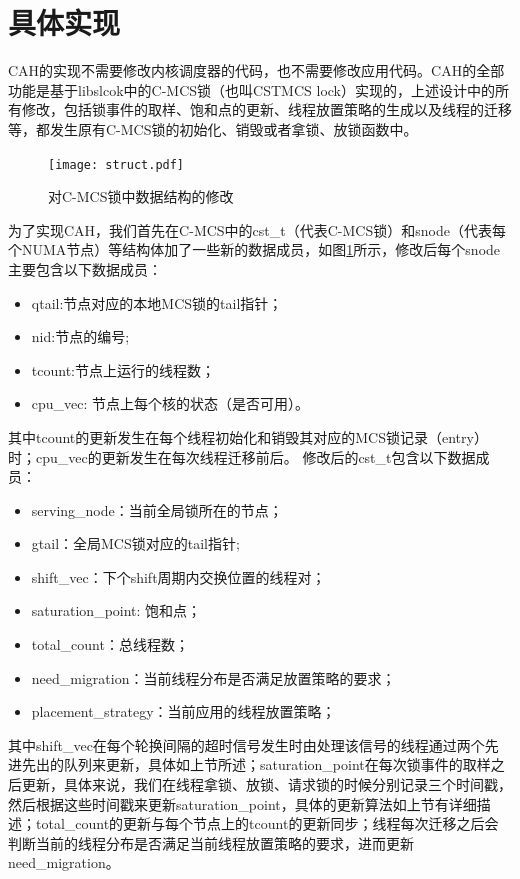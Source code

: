 \section{具体实现}
CAH的实现不需要修改内核调度器的代码，也不需要修改应用代码。CAH的全部功能是基于libslcok\cite{kashyap2017scalable}中的C-MCS锁（也叫CSTMCS lock）实现的，上述设计中的所有修改，包括锁事件的取样、饱和点的更新、线程放置策略的生成以及线程的迁移等，都发生原有C-MCS锁的初始化、销毁或者拿锁、放锁函数中。

\begin{figure}[t]
	\centering
	\texttt{[image: struct.pdf]}
	\caption{对C-MCS锁中数据结构的修改}
	\label{Fig:struct}
\end{figure}

为了实现CAH，我们首先在C-MCS中的cst\_t（代表C-MCS锁）和snode（代表每个NUMA节点）等结构体加了一些新的数据成员，如图\ref{Fig:struct}所示，修改后每个snode主要包含以下数据成员：
\begin{itemize}
\item qtail:节点对应的本地MCS锁的tail指针；
\item nid:节点的编号;
\item tcount:节点上运行的线程数；
\item cpu\_vec: 节点上每个核的状态（是否可用）。
\end{itemize}
其中tcount的更新发生在每个线程初始化和销毁其对应的MCS锁记录（entry）时；cpu\_vec的更新发生在每次线程迁移前后。
修改后的cst\_t包含以下数据成员：
\begin{itemize}
\item serving\_node：当前全局锁所在的节点；
\item gtail：全局MCS锁对应的tail指针;
\item shift\_vec：下个shift周期内交换位置的线程对；
\item saturation\_point: 饱和点；
\item total\_count：总线程数；
\item need\_migration：当前线程分布是否满足放置策略的要求；
\item placement\_strategy：当前应用的线程放置策略；
\end{itemize}
其中shift\_vec在每个轮换间隔的超时信号发生时由处理该信号的线程通过两个先进先出的队列来更新，具体如上节所述；saturation\_point在每次锁事件的取样之后更新，具体来说，我们在线程拿锁、放锁、请求锁的时候分别记录三个时间戳，然后根据这些时间戳来更新saturation\_point，具体的更新算法如上节有详细描述；total\_count的更新与每个节点上的tcount的更新同步；线程每次迁移之后会判断当前的线程分布是否满足当前线程放置策略的要求，进而更新need\_migration。

